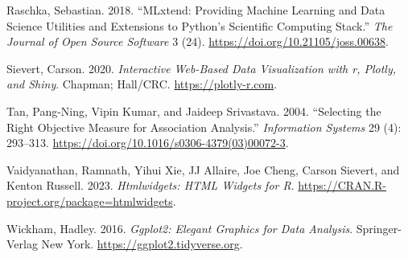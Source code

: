 \documentclass{article}
\newlength{\cslhangindent}
\newlength{\cslentryspacingunit} %
\newenvironment{CSLReferences}[2] %
 {%
  \setlength{\parindent}{0pt}
  \ifodd #1
  \let\oldpar\par
  \def\par{\hangindent=\cslhangindent\oldpar}
  \fi
  \setlength{\parskip}{#2\cslentryspacingunit}
 }%
 {}
\begin{document}
\begin{CSLReferences}{1}{0}
\leavevmode{}%
Raschka, Sebastian. 2018. {``MLxtend: Providing Machine Learning and
Data Science Utilities and Extensions to Python's Scientific Computing
Stack.''} \emph{The Journal of Open Source Software} 3 (24).
\url{https://doi.org/10.21105/joss.00638}.

\leavevmode{}%
Sievert, Carson. 2020. \emph{Interactive Web-Based Data Visualization
with r, Plotly, and Shiny}. Chapman; Hall/CRC.
\url{https://plotly-r.com}.

\leavevmode{}%
Tan, Pang-Ning, Vipin Kumar, and Jaideep Srivastava. 2004. {``Selecting
the Right Objective Measure for Association Analysis.''}
\emph{Information Systems} 29 (4): 293--313.
\url{https://doi.org/10.1016/s0306-4379(03)00072-3}.

\leavevmode{}%
Vaidyanathan, Ramnath, Yihui Xie, JJ Allaire, Joe Cheng, Carson Sievert,
and Kenton Russell. 2023. \emph{Htmlwidgets: {HTML} Widgets for {R}}.
\url{https://CRAN.R-project.org/package=htmlwidgets}.

\leavevmode{}%
Wickham, Hadley. 2016. \emph{Ggplot2: {E}legant Graphics for Data
Analysis}. Springer-Verlag New York.
\url{https://ggplot2.tidyverse.org}.

\end{CSLReferences}



\end{document}
